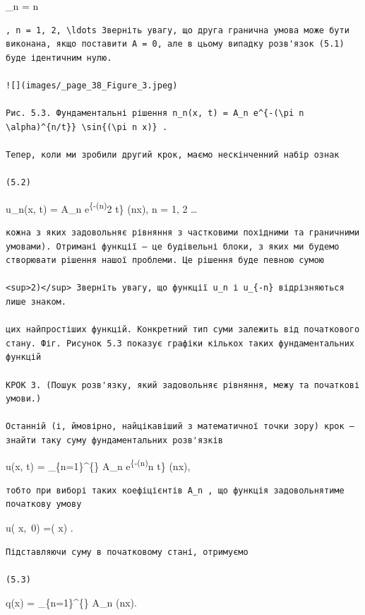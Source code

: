 \documentclass[
  ukrainian,
]{article}
\begin{document}
\lambda\_n = \pm n\pi

\begin{verbatim}
, n = 1, 2, \ldots Зверніть увагу, що друга гранична умова може бути виконана, якщо поставити A = 0, але в цьому випадку розв'язок (5.1) буде ідентичним нулю.

![](images/_page_38_Figure_3.jpeg)

Рис. 5.3. Фундаментальні рішення n_n(x, t) = A_n e^{-(\pi n \alpha)^{n/t}} \sin{(\pi n x)} .

Тепер, коли ми зробили другий крок, маємо нескінченний набір ознак

(5.2)
\end{verbatim}

u\_n(x, t) = A\_n e\textsuperscript{\{-(n\pi\alpha)}2 t\} \sin(n\pi x),
\quad n = 1, 2 \dots

\begin{verbatim}
кожна з яких задовольняє рівняння з частковими похідними та граничними умовами). Отримані функції — це будівельні блоки, з яких ми будемо створювати рішення нашої проблеми. Це рішення буде певною сумою

<sup>2)</sup> Зверніть увагу, що функції u_n і u_{-n} відрізняються лише знаком.

цих найпростіших функцій. Конкретний тип суми залежить від початкового стану. Фіг. Рисунок 5.3 показує графіки кількох таких фундаментальних функцій

КРОК 3. (Пошук розв'язку, який задовольняє рівняння, межу та початкові умови.)

Останній (і, ймовірно, найцікавіший з математичної точки зору) крок — знайти таку суму фундаментальних розв'язків
\end{verbatim}

u(x, t) = \sum\_\{n=1\}\^{}\{\infty\} A\_n
e\textsuperscript{\{-(n\pi\alpha)}n t\} \sin(n\pi x),

\begin{verbatim}
тобто при виборі таких коефіцієнтів A_n , що функція задовольнятиме початкову умову
\end{verbatim}

u\left( x,~0\right) =\varphi\left( x\right) .

\begin{verbatim}
Підставляючи суму в початковому стані, отримуємо

(5.3)
\end{verbatim}

q(x) = \sum\_\{n=1\}\^{}\{\infty\} A\_n \sin(n\pi x).
\end{document}
